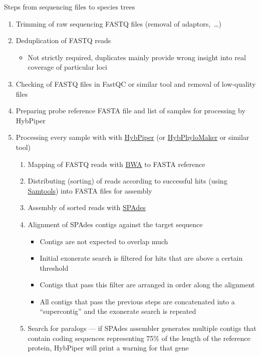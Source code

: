 \documentclass[compress, ucs, xelatex, 11pt, xcolor=x11names, aspectratio=1609,
	hyperref={
		bookmarks=true,
		unicode=true,
		colorlinks=true,
		pdftitle={HybSeq course},
		plainpages=false,
		pdfauthor={Vojtech Zeisek},
		pdfsubject={Practical processing of HybSeq target enrichment sequencing data on computing grids like MetaCentrum},
		pdfcreator={XeLaTeX},
		pdfkeywords={BASH, command line, GNU, HybSeq, Linux, MetaCentrum, sequencing shell, target enrichment},
		linkcolor=Cyan2, %
		anchorcolor=Firebrick2, %
		citecolor=Firebrick2, %
		filecolor=Firebrick2, %
		menucolor=Firebrick2, %
		urlcolor=Chartreuse2, %
		pdftex},
	url={hyphens, lowtilde} %
	]{beamer}
\begin{document}
\begin{frame}[allowframebreaks]{Steps from sequencing files to species trees}
	\begin{enumerate}
		\item Trimming of raw sequencing FASTQ files (removal of adaptors,~\ldots)
		\item Deduplication of FASTQ reads
		\begin{itemize}
			\item Not strictly required, duplicates mainly provide wrong insight into real coverage of particular loci
		\end{itemize}
		\item Checking of FASTQ files in FastQC or similar tool and removal of low-quality files
		\item Preparing probe reference FASTA file and list of samples for processing by HybPiper
		\item Processing every sample with with \href{https://github.com/mossmatters/HybPiper/wiki}{HybPiper} (or \href{https://github.com/tomas-fer/HybPhyloMaker}{HybPhyloMaker} or similar tool)
		\begin{enumerate}
			\item Mapping of FASTQ reads with \href{https://github.com/lh3/bwa}{BWA} to FASTA reference
			\item Distributing (sorting) of reads according to successful hits (using \href{https://github.com/samtools/samtools}{Samtools}) into FASTA files for assembly
			\item Assembly of sorted reads with \href{https://github.com/ablab/spades}{SPAdes}
			\item Alignment of SPAdes contigs against the target sequence
			\begin{itemize}
				\item Contigs are not expected to overlap much
				\item Initial exonerate search is filtered for hits that are above a certain threshold
				\item Contigs that pass this filter are arranged in order along the alignment
				\item All contigs that pass the previous steps are concatenated into a \enquote{supercontig} and the exonerate search is repeated
			\end{itemize}
			\item Search for paralogs --- if SPAdes assembler generates multiple contigs that contain coding sequences representing 75\% of the length of the reference protein, HybPiper will print a warning for that gene

\end{enumerate}
\end{enumerate}
\end{frame}
\end{document}

